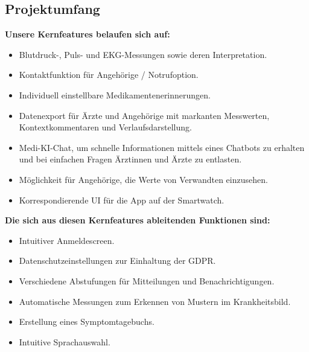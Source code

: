 \subsection{Projektumfang}
\textbf{Unsere Kernfeatures belaufen sich auf:}
\begin{itemize}
	\item Blutdruck-, Puls- und EKG-Messungen sowie deren Interpretation.
	\item Kontaktfunktion für Angehörige / Notrufoption.
	\item Individuell einstellbare Medikamentenerinnerungen.
	\item Datenexport für Ärzte und Angehörige mit markanten Messwerten, Kontextkommentaren und Verlaufsdarstellung.
	\item Medi-KI-Chat, um schnelle Informationen mittels eines Chatbots zu erhalten und bei einfachen Fragen Ärztinnen und Ärzte zu entlasten.
	\item Möglichkeit für Angehörige, die Werte von Verwandten einzusehen.
	\item Korrespondierende UI für die App auf der Smartwatch.
\end{itemize}

\textbf{Die sich aus diesen Kernfeatures ableitenden Funktionen sind:}
\begin{itemize}
	\item Intuitiver Anmeldescreen.
	\item Datenschutzeinstellungen zur Einhaltung der GDPR.
	\item Verschiedene Abstufungen für Mitteilungen und Benachrichtigungen.
	\item Automatische Messungen zum Erkennen von Mustern im Krankheitsbild.
	\item Erstellung eines Symptomtagebuchs.
	\item Intuitive Sprachauswahl.
\end{itemize}

\newpage


